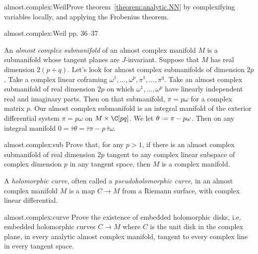 \begin{problem*}{almost.complex:Weil}Prove theorem~\vref{theorem:analytic.NN} by complexifying variables locally, and applying the Frobenius theorem.\end{problem*}
\begin{answer}{almost.complex:Weil}
\cite{Weil:1958} pp. 36--37
\end{answer}
%
An \emph{almost complex submanifold} of an almost complex manifold \(M\) is a submanifold whose tangent planes are \(J\)-invariant.
Suppose that \(M\) has real dimension \(2(p+q)\).
Let's look for almost complex submanifolds of dimension \(2p\).
Take a complex linear coframing \(\omega^1,\dots,\omega^p,\pi^1,\dots,\pi^q\).
Take an almost complex submanifold of real dimension \(2p\) on which \(\omega^1,\dots,\omega^p\) have linearly independent real and imaginary parts.
Then on that submanifold, \(\pi=p\omega\) for a complex matrix \(p\).
Our almost complex submanifold is an integral manifold of the exterior differential system \(\pi=p\omega\) on \(M\times\C[pq]\).
We let \(\theta\defeq\pi-p\omega\).
Then on any integral manifold \(0=\bar\tau\theta=\bar\tau\pi-p \, \bar\tau\omega\).
\begin{problem}{almost.complex:sub}
Prove that, for any \(p>1\), if there is an almost complex submanifold of real dimension \(2p\) tangent to any complex linear subspace of complex dimension \(p\) in any tangent space, then \(M\) is a complex manifold.
\end{problem}
A \emph{holomorphic curve}, often called a \emph{pseudoholomorphic curve}, in an almost complex manifold \(M\) is a map \(C \to M\) from a Riemann surface, with complex linear differential.
\begin{problem}{almost.complex:curve}
Prove the existence of embedded holomorphic disks, i.e. embedded holomorphic curves \(C \to M\) where \(C\) is the unit disk in the complex plane, in every analytic almost complex manifold, tangent to every complex line in every tangent space.
\end{problem}